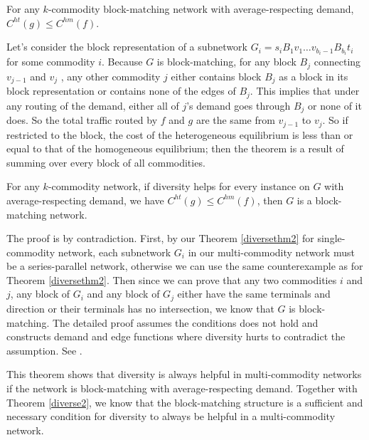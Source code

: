 \begin{theorem}
For any $k$-commodity block-matching network with average-respecting demand, $C^{ht}(g)\le C^{hm}(f)$.
\label{diverse2}
\end{theorem}

\begin{proof-sketch}

Let's consider the block representation of a subnetwork $G_i=s_i B_1 v_1\dots v_{b_i-1} B _{b_i}t_i$ for some commodity $i$. Because $G$ is block-matching, for any block $B_j$ connecting $v_{j-1}$ and $v_j$ , any other commodity $j$ either contains block $B_j$ as a block in its block representation or contains none of the edges of $B_j$. This implies that under any routing of the demand, either all of $j$'s demand goes through $B_j$ or none of it does. So the total traffic routed by $f$ and $g$ are the same from $v_{j-1}$ to $v_j$. So if restricted to the block, the cost of the heterogeneous equilibrium is less than or equal to that of the homogeneous equilibrium; then the theorem is a result of summing over every block of all commodities.

\end{proof-sketch}



\begin{theorem}
For any $k$-commodity network, if diversity helps for every instance on $G$ with average-respecting demand, we have $C^{ht}(g)\le C^{hm}(f)$, then $G$ is a block-matching network.
\end{theorem}

\begin{proof-sketch}
    The proof is by contradiction. First, by our Theorem \ref{diversethm2} for single-commodity network, each subnetwork $G_i$ in our multi-commodity network must be a series-parallel network, otherwise we can use the same counterexample as for Theorem \ref{diversethm2}. Then since we can prove  that any two commodities $i$ and $j$, any block of $G_i$ and any block of $G_j$ either have the same terminals and direction or their terminals has no intersection, we know that $G$ is block-matching. The detailed proof assumes the conditions does not hold and constructs demand and edge functions where diversity hurts to contradict the assumption. See \cite{ijcai2018-24}.
\end{proof-sketch}

This theorem shows that diversity is always helpful in multi-commodity networks if the network is block-matching with average-respecting demand. Together with Theorem \ref{diverse2}, we know that the block-matching structure is a sufficient and necessary condition for diversity to always be helpful in a multi-commodity network.

